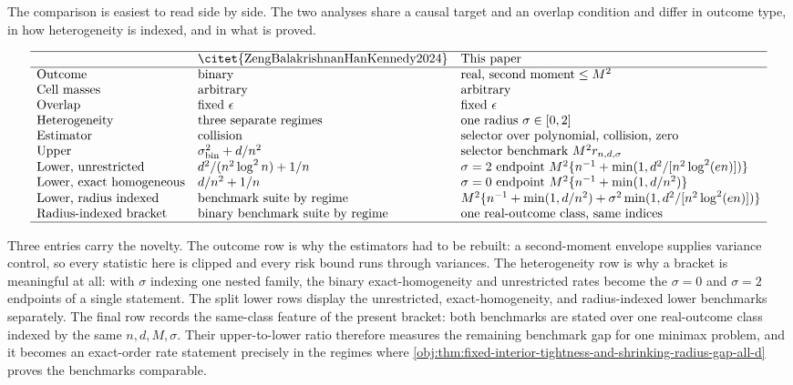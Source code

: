 \documentclass[11pt]{article}
\begin{document}
The comparison is easiest to read side by side. The two analyses share a causal target and an overlap condition and differ in outcome type, in how heterogeneity is indexed, and in what is proved.

\[
\begin{array}{lll}
\hline
 & \text{\citet{ZengBalakrishnanHanKennedy2024}} & \text{This paper}\\
\hline
\text{Outcome} & \text{binary} & \text{real, second moment} \le M^2\\
\text{Cell masses} & \text{arbitrary} & \text{arbitrary}\\
\text{Overlap} & \text{fixed }\epsilon & \text{fixed }\epsilon\\
\text{Heterogeneity} & \text{three separate regimes} & \text{one radius }\sigma\in[0,2]\\
\text{Estimator} & \text{collision} & \text{selector over polynomial, collision, zero}\\
\text{Upper} & \sigma_{\mathrm{bin}}^2+d/n^2 & \text{selector benchmark }M^2 r_{n,d,\sigma}\\
\text{Lower, unrestricted} & d^2/(n^2\log^2 n)+1/n & \sigma=2\text{ endpoint }M^2\{n^{-1}+\min(1,d^2/[n^2\log^2(en)])\}\\
\text{Lower, exact homogeneous} & d/n^2+1/n & \sigma=0\text{ endpoint }M^2\{n^{-1}+\min(1,d/n^2)\}\\
\text{Lower, radius indexed} & \text{benchmark suite by regime} & M^2\{n^{-1}+\min(1,d/n^2)+\sigma^2\min(1,d^2/[n^2\log^2(en)])\}\\
\text{Radius-indexed bracket} & \text{binary benchmark suite by regime} & \text{one real-outcome class, same indices}\\
\hline
\end{array}
\]

Three entries carry the novelty. The outcome row is why the estimators had to be rebuilt: a second-moment envelope supplies variance control, so every statistic here is clipped and every risk bound runs through variances. The heterogeneity row is why a bracket is meaningful at all: with \(\sigma\) indexing one nested family, the binary exact-homogeneity and unrestricted rates become the \(\sigma=0\) and \(\sigma=2\) endpoints of a single statement. The split lower rows display the unrestricted, exact-homogeneity, and radius-indexed lower benchmarks separately. The final row records the same-class feature of the present bracket: both benchmarks are stated over one real-outcome class indexed by the same \(n,d,M,\sigma\). Their upper-to-lower ratio therefore measures the remaining benchmark gap for one minimax problem, and it becomes an exact-order rate statement precisely in the regimes where \cref{obj:thm:fixed-interior-tightness-and-shrinking-radius-gap-all-d} proves the benchmarks comparable.
\end{document}
